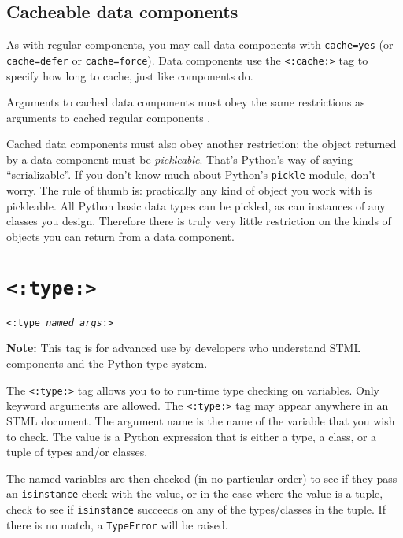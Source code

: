 \documentclass{manual}
\begin{document}
\subsection{Cacheable data components}
\label{tagdatacompcaching}

As with regular components, you may call data components with
\texttt{cache=yes} (or \texttt{cache=defer} or
\texttt{cache=force}). Data components use the \texttt{<:cache:>}
 tag to specify how long to cache, just like
components do.

Arguments to cached data components must obey the same 
restrictions as arguments 
to cached regular components .

Cached data components must also obey another restriction: 
the object returned by a data component must be \emph{pickleable}. 
That's Python's way of saying ``serializable''. If you don't 
know much about Python's \texttt{pickle} module, don't worry. 
The rule of thumb is: practically any kind of object you work 
with is pickleable. All Python basic data types can be pickled, 
as can instances of any classes you design. Therefore there is 
truly very little restriction on the kinds of objects you can 
return from a data component.




\section{\texttt{<:type:>}}
\label{tagtype}

\texttt{<:type \emph{named_args}:>}

\textbf{Note:} This tag is for advanced use by developers
who understand STML components and the Python type system.

The \texttt{<:type:>} tag allows you to to 
run-time type checking on variables.
Only keyword arguments are allowed.  The \texttt{<:type:>} 
tag may appear anywhere in an STML document. The argument name 
is the name of the variable that you wish to check.  
The value is a Python expression that is either a type, 
a class, or a tuple of types and/or classes.


The named variables are then checked (in no particular order) to see
if they pass an 
\texttt{isinstance} check with the value, or in the case where the
value is a tuple, check to see if \texttt{isinstance} succeeds on any
of the types/classes in the tuple.  If there is no match, a
\texttt{TypeError} will be raised.
\end{document}
